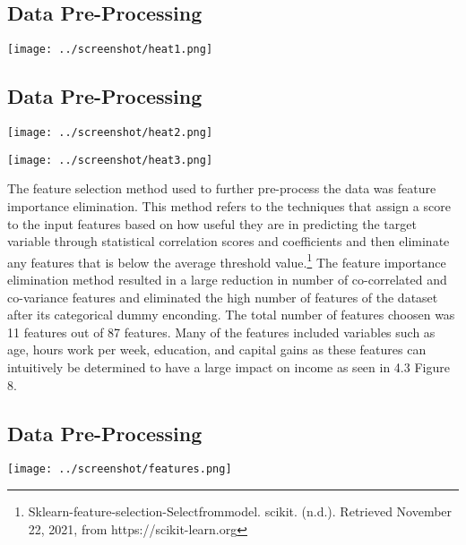\documentclass[12pt]{article}
\begin{document}
\begin{multicols*}{2}
\subsection{Data Pre-Processing}
  \begin{center}
	\texttt{[image: ../screenshot/heat1.png]}
  \end{center}

  \subsection{Data Pre-Processing}
  \begin{center}
	\texttt{[image: ../screenshot/heat2.png]}

	\texttt{[image: ../screenshot/heat3.png]}
  \end{center}

  \hspace*{5mm} The feature selection method used to further pre-process the data was feature importance elimination. This method refers to the techniques that assign a score to the input features
  based on how useful they are in predicting the target variable through statistical correlation scores and coefficients and then eliminate any features that is below the average
  threshold value.\footnote[4]{Sklearn-feature-selection-Selectfrommodel. scikit. (n.d.). Retrieved November 22, 2021, from  https://scikit-learn.org} The feature importance elimination method resulted in a large
  reduction in number of co-correlated and co-variance features and eliminated the high number of features of the dataset after its categorical dummy enconding. 
  The total number of features choosen was 11 features out of 87 features. Many of the features included variables such as age, hours work per week, education, and capital gains as these features can intuitively be determined to have
  a large impact on income as seen in 4.3 Figure 8. 


  \subsection{Data Pre-Processing}
  \begin{center}
	\texttt{[image: ../screenshot/features.png]}
  \end{center}

\end{multicols*}
\end{document}
